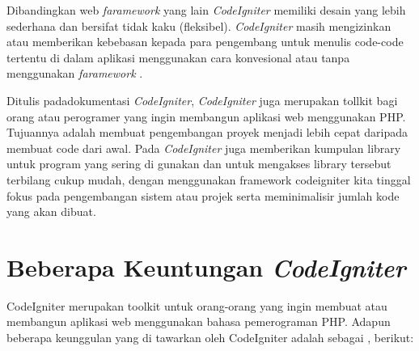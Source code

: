 Dibandingkan web \textit{faramework} yang lain \textit{CodeIgniter} memiliki desain yang lebih sederhana dan bersifat tidak kaku (fleksibel). \textit{CodeIgniter} masih mengizinkan atau memberikan kebebasan kepada para pengembang untuk menulis code-code tertentu di dalam aplikasi menggunakan cara konvesional atau tanpa menggunakan \textit{faramework} \cite{david2017codeigniter}.\par

Ditulis padadokumentasi \textit{CodeIgniter}, \textit{CodeIgniter} juga merupakan tollkit bagi orang atau perogramer yang ingin membangun aplikasi web menggunakan PHP. Tujuannya adalah membuat pengembangan proyek menjadi lebih cepat daripada membuat code dari awal. Pada \textit{CodeIgniter} juga memberikan kumpulan library untuk program yang sering di gunakan dan untuk mengakses library tersebut terbilang cukup mudah, dengan menggunakan framework codeigniter kita tinggal fokus pada pengembangan sistem atau projek serta meminimalisir jumlah kode yang akan dibuat.\pagebreak

\section{Beberapa Keuntungan \textit{CodeIgniter}}
CodeIgniter merupakan toolkit untuk orang-orang yang ingin membuat atau membangun aplikasi web menggunakan bahasa pemerograman PHP. Adapun beberapa keunggulan yang di tawarkan oleh CodeIgniter adalah sebagai \cite{raharjo2015belajar} , \cite{subagia2018kolaborasi} berikut:\par


